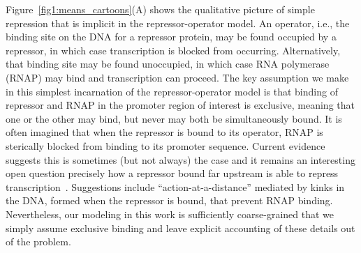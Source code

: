 Figure~\ref{fig1:means_cartoons}(A) shows the qualitative picture of simple
repression that is implicit in the repressor-operator model. An operator, i.e.,
the binding site on the DNA for a repressor protein, may be found occupied by a
repressor, in which case transcription is blocked from occurring. Alternatively,
that binding site may be found unoccupied, in which case RNA polymerase (RNAP)
may bind and transcription can proceed. The key assumption we make in this
simplest incarnation of the repressor-operator model is that binding of
repressor and RNAP in the promoter region of interest is exclusive, meaning that
one or the other may bind, but never may both be simultaneously bound. It is
often imagined that when the repressor is bound to its operator, RNAP is
sterically blocked from binding to its promoter sequence. Current evidence
suggests this is sometimes (but not always) the case and it remains an
interesting open question precisely how a repressor bound far upstream is able
to repress transcription~\cite{Rydenfelt2014-2}. Suggestions include
``action-at-a-distance'' mediated by kinks in the DNA, formed when the repressor
is bound, that prevent RNAP binding. Nevertheless, our modeling in this work is
sufficiently coarse-grained that we simply assume exclusive binding and leave
explicit accounting of these details out of the problem.

